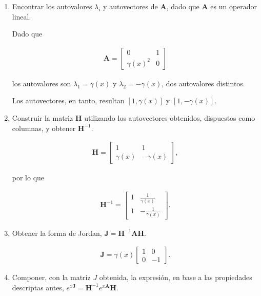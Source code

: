 \begin{enumerate}
	\item Encontrar los autovalores $\lambda_i$ y autovectores de $\textbf{A}$, dado que $\textbf{A}$ es un operador lineal.
	
	Dado que
	
	\begin{align}
	\textbf{A} = 
	\begin{bmatrix}
	0 & 1 \\
	\gamma(x)^2 & 0
	\end{bmatrix}
	\end{align}
	
	los autovalores son $\lambda_1 = \gamma(x)$ y $\lambda_2 = -\gamma(x)$, dos autovalores distintos.
	
	Los autovectores, en tanto, resultan $[1,\gamma(x)]$ y $[1,-\gamma(x)]$.
	
	\item Construir la matriz $\textbf{H}$ utilizando los autovectores obtenidos, dispuestos como columnas, y obtener $\textbf{H}^{-1}$.
	
	\begin{align}
	\textbf{H} = 
	\begin{bmatrix}
	1 & 1 \\
	\gamma(x) & -\gamma(x)
	\end{bmatrix},
	\end{align}
	
	por lo que
	
	\begin{align}
	\textbf{H}^{-1} = 
	\begin{bmatrix}
	1 & \frac{1}{\gamma(x)} \\
	1 & -\frac{1}{\gamma(x)}
	\end{bmatrix}.
	\end{align}	
	
	\item Obtener la forma de Jordan, $\textbf{J} = \textbf{H}^{-1} \textbf{A} \textbf{H}$.
	
	\begin{align}
	\textbf{J} = \gamma(x) 
	\begin{bmatrix}
	1 & 0 \\
	0 & -1
	\end{bmatrix}.
	\end{align}
	
	\item Componer, con la matriz $J$ obtenida, la expresión, en base a las propiedades descriptas antes, $e^{x\textbf{J}} = \textbf{H}^{-1} e^{x\textbf{A}} \textbf{H}$.
	

\end{enumerate}

